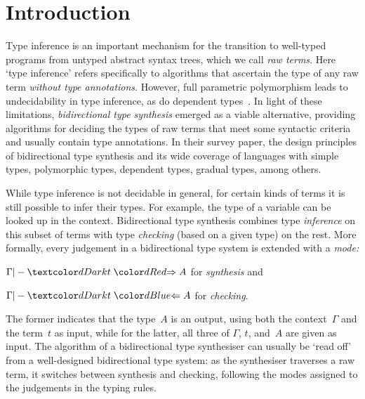
\section{Introduction}\label{sec:intro}

Type inference is an important mechanism for the transition to well-typed programs from untyped abstract syntax trees, which we call \emph{raw terms}.
Here `type inference' refers specifically to algorithms that ascertain the type of any raw term \emph{without type annotations}.
However, full parametric polymorphism leads to undecidability in type inference, as do dependent types~\cite{Wells1999,Dowek1993}.
In light of these limitations, \emph{bidirectional type synthesis} emerged as a viable alternative, providing algorithms for deciding the types of raw terms that meet some syntactic criteria and usually contain type annotations.
In their survey paper,  the design principles of bidirectional type synthesis and its wide coverage of languages with simple types, polymorphic types, dependent types, gradual types, among others.

While type inference is not decidable in general, for certain kinds of terms it is still possible to infer their types.
For example, the type of a variable can be looked up in the context.
Bidirectional type synthesis combines type \emph{inference} on this subset of terms with type \emph{checking} (based on a given type) on the rest.
More formally, every judgement in a bidirectional type system is extended with a \emph{mode:}
\begin{inlineenum}
  \item $\Gamma |- \isTerm{t} \syn A$ for \emph{synthesis} and 
  \item $\Gamma |- \isTerm{t} \chk A$ for \emph{checking}.
\end{inlineenum}
The former indicates that the type~$A$ is an output, using both the context~$\Gamma$ and the term~$t$ as input, while for the latter, all three of $\Gamma$, $t$, and~$A$ are given as input.
The algorithm of a bidirectional type synthesiser can usually be `read off' from a well-designed bidirectional type system: as the synthesiser traverses a raw term, it switches between synthesis and checking, following the modes assigned to the judgements in the typing rules.


